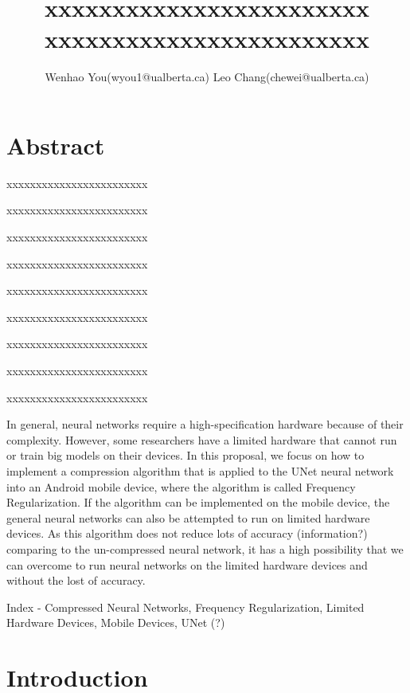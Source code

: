 \documentclass{article}
\title{xxxxxxxxxxxxxxxxxxxxxxxx xxxxxxxxxxxxxxxxxxxxxxxx}
\author{Wenhao You(wyou1@ualberta.ca) Leo Chang(chewei@ualberta.ca)}
\date{}
\begin{document}
	\maketitle
	
	
	
	
	
	
	\section*{Abstract}

	xxxxxxxxxxxxxxxxxxxxxxxx
	
	xxxxxxxxxxxxxxxxxxxxxxxx
	
	xxxxxxxxxxxxxxxxxxxxxxxx
	
	xxxxxxxxxxxxxxxxxxxxxxxx
	
	xxxxxxxxxxxxxxxxxxxxxxxx
	
	xxxxxxxxxxxxxxxxxxxxxxxx
	
	xxxxxxxxxxxxxxxxxxxxxxxx
	
	xxxxxxxxxxxxxxxxxxxxxxxx
	
	xxxxxxxxxxxxxxxxxxxxxxxx

In general, neural networks require a high-specification hardware because of their complexity. However, some researchers have a limited hardware that cannot run or train big models on their devices. In this proposal, we focus on how to implement a compression algorithm that is applied to the UNet neural network into an Android mobile device, where the algorithm is called Frequency Regularization. If the algorithm can be implemented on the mobile device, the general neural networks can also be attempted to run on limited hardware devices. As this algorithm does not reduce lots of accuracy (information?) comparing to the un-compressed neural network, it has a high possibility that we can overcome to run neural networks on the limited hardware devices and without the lost of accuracy.

Index - Compressed Neural Networks, Frequency Regularization, Limited Hardware Devices, Mobile Devices, UNet (?)


	\section*{Introduction}
	
\end{document}
